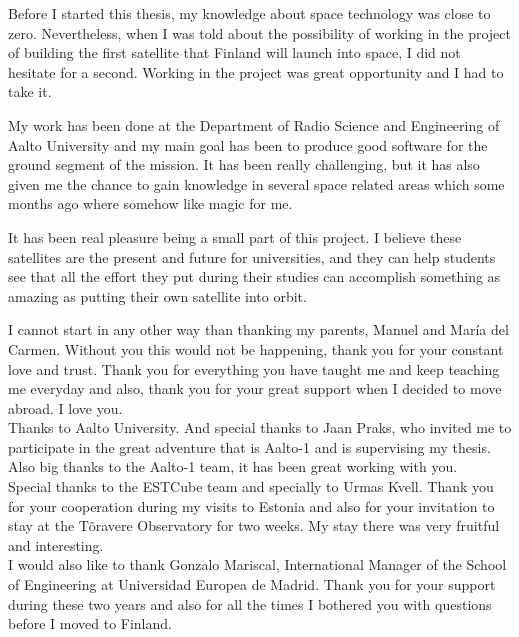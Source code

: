 
Before I started this thesis, my knowledge about space technology was close to zero. Nevertheless, when I was told about the possibility of working in the project of building the first satellite that Finland will launch into space, I did not hesitate for a second. Working in the project was great opportunity and I had to take it.

My work has been done at the Department of Radio Science and Engineering of Aalto University and my main goal has been to produce good software for the ground segment of the mission. It has been really challenging, but it has also given me the chance to gain knowledge in several space related areas which some months ago where somehow like magic for me.

It has been real pleasure being a small part of this project. I believe these satellites are the present and future for universities, and they can help students see that all the effort they put during their studies can accomplish something as amazing as putting their own satellite into orbit.


\thispagestyle{plain}
\pagebreak


I cannot start in any other way than thanking my parents, Manuel and María del Carmen. Without you this would not be happening, thank you for your constant love and trust. Thank you for everything you have taught me and keep teaching me everyday and also, thank you for your great support when I decided to move abroad. I love you.\\

Thanks to Aalto University. And special thanks to Jaan Praks, who invited me to participate in the great adventure that is Aalto-1 and is supervising my thesis. Also big thanks to the Aalto-1 team, it has been great working with you.\\

Special thanks to the ESTCube team and specially to Urmas Kvell. Thank you for your cooperation during my visits to Estonia and also for your invitation to stay at the Tõravere Observatory for two weeks. My stay there was very fruitful  and interesting.\\

I would also like to thank Gonzalo Mariscal, International Manager of the School of Engineering at Universidad Europea de Madrid. Thank you for your support during these two years and also for all the times I bothered you with questions before I moved to Finland.\\

